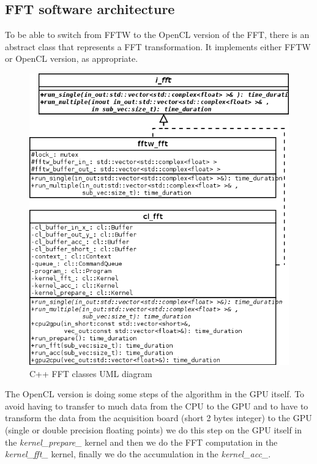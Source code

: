 \subsection{FFT software architecture}

To be able to switch from \gls{FFTW} to the \gls{OpenCL} version of the \gls{FFT}, there is an abstract class that represents a \gls{FFT} transformation. It implements either \gls{FFTW} or \gls{OpenCL} version, as appropriate.

\begin{figure}[H]
\centering
\caption{C++ FFT classes UML diagram}
\includegraphics[scale=0.5]{fft_uml.png}
\end{figure}

The \gls{OpenCL} version is doing some steps of the algorithm in the \gls{GPU} itself. To avoid having to transfer to much data from the CPU to the GPU and to have to transform the data from the acquisition board (short 2 bytes integer) to the \gls{GPU} (single or double precision floating points) we do this step on the \gls{GPU} itself in the \emph{kernel\_prepare\_} kernel and then we do the \gls{FFT} computation in the \emph{kernel\_fft\_} kernel, finally we do the accumulation in the \emph{kernel\_acc\_}.

